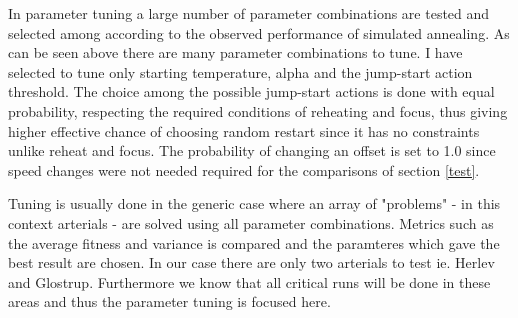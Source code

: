 In parameter tuning a large number of parameter combinations are tested and selected among according to the observed performance of simulated annealing. As can be seen above there are many parameter combinations to tune. I have selected to tune only starting temperature, alpha and the jump-start action threshold. The choice among the possible jump-start actions is done with equal probability, respecting the required conditions of reheating and focus, thus giving higher effective chance of choosing random restart since it has no constraints unlike reheat and focus. The probability of changing an offset is set to 1.0 since speed changes were not needed required for the comparisons of section \ref{test}.

Tuning is usually done in the generic case where an array of "problems" - in this context arterials - are solved using all parameter combinations. Metrics such as the average fitness and variance is compared and the paramteres which gave the best result are chosen. In our case there are only two arterials to test ie. Herlev and Glostrup. Furthermore we know that all critical runs will be done in these areas and thus the parameter tuning is focused here.

